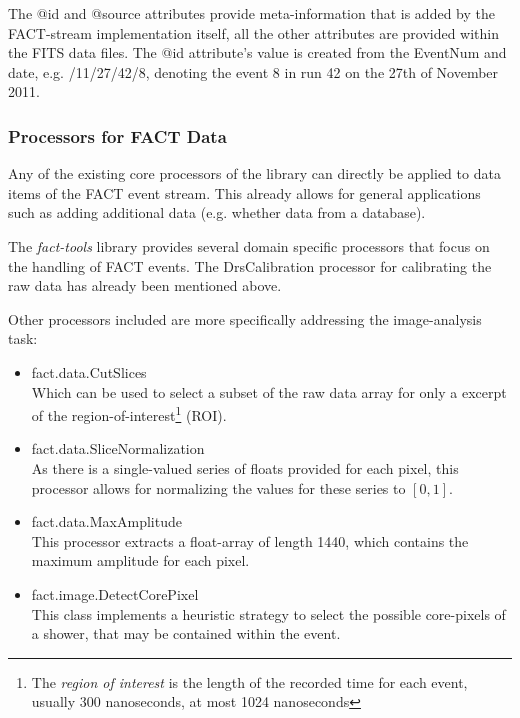 The {\ttfamily @id} and {\ttfamily @source} attributes provide meta-information that is added by
the FACT-stream implementation itself, all the other attributes are provided within
the FITS data files. The {\ttfamily @id} attribute's value is created
from the {\ttfamily EventNum} and date, e.g. {/11/27/42/8}, denoting the event 8 in run 42 on the 27th of
November 2011.


\subsubsection{Processors for FACT Data}
Any of the existing core processors of the \streams library can directly be applied
to data items of the FACT event stream. This already allows for general applications
such as adding additional data (e.g. whether data from a database).

The {\em fact-tools} library provides several domain specific processors that focus
on the handling of FACT events. The {\ttfamily DrsCalibration} processor for calibrating
the raw data has already been mentioned above.

Other processors included are more specifically addressing the image-analysis task:
\begin{itemize}
  \item {\ttfamily fact.data.CutSlices} \\
  Which can be used to select a subset of the raw data array for only a excerpt of
  the region-of-interest\footnote{The {\em region of interest} is the length of the
  recorded time for each event, usually 300 nanoseconds, at most 1024 nanoseconds} (ROI).

  \item {\ttfamily fact.data.SliceNormalization} \\
  As there is a single-valued series of floats provided for each pixel, this processor
  allows for normalizing the values for these series to $[0,1]$.

  \item {\ttfamily fact.data.MaxAmplitude} \\
  This processor extracts a float-array of length 1440, which contains the maximum
  amplitude for each pixel.

  \item {\ttfamily fact.image.DetectCorePixel} \\
  This class implements a heuristic strategy to select the possible core-pixels of
  a shower, that may be contained within the event.
\end{itemize}


